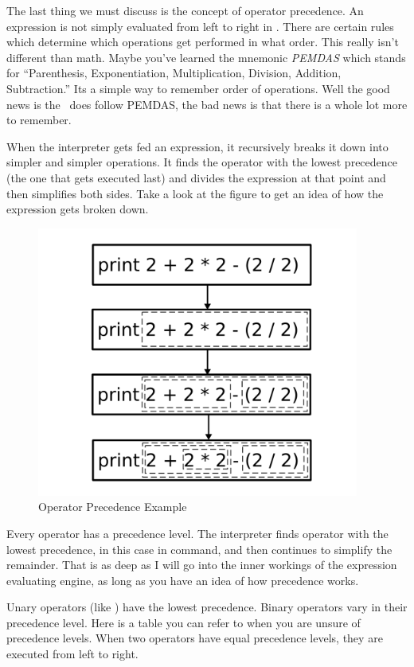 The last thing we must discuss is the concept of operator precedence.  An expression is not simply evaluated from left to right in \SSquared{}.  There are certain rules which determine which operations get performed in what order.  This really isn't different than math.  Maybe you've learned the mnemonic \emph{PEMDAS} which stands for ``Parenthesis, Exponentiation, Multiplication, Division, Addition, Subtraction.''  Its a simple way to remember order of operations.  Well the good news is the \SSquared\ does follow PEMDAS, the bad news is that there is a whole lot more to remember.

When the interpreter gets fed an expression, it recursively breaks it down into simpler and simpler operations.  It finds the operator with the lowest precedence (the one that gets executed last) and divides the expression at that point and then simplifies both sides.  Take a look at the figure to get an idea of how the expression  gets broken down.

\begin{figure}[h]
\centering
\includegraphics[width=300pt]{graphics/PrecedenceExample}
\caption{Operator Precedence Example}
\end{figure}

Every operator has a precedence level.  The interpreter finds operator with the lowest precedence, in this case in  command, and then continues to simplify the remainder.  That is as deep as I will go into the inner workings of the expression evaluating engine, as long as you have an idea of how precedence works.  

Unary operators (like ) have the lowest precedence.  Binary operators vary in their precedence level.  Here is a table you can refer to when you are unsure of precedence levels.  When two operators have equal precedence levels, they are executed from left to right.

